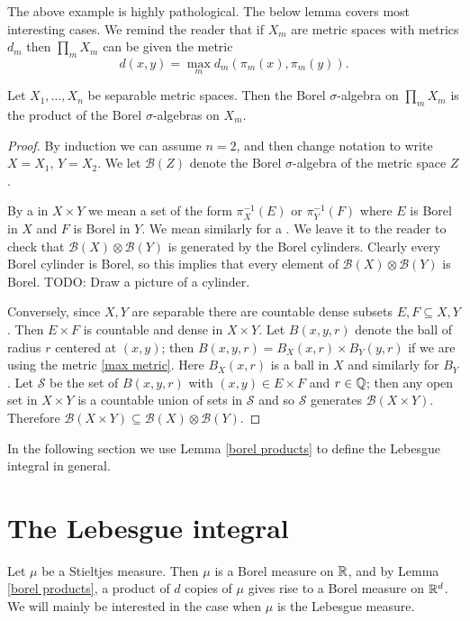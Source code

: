 The above example is highly pathological.
The below lemma covers most interesting cases.
We remind the reader that if $X_m$ are metric spaces with metrics $d_m$ then $\prod_m X_m$ can be given the metric
\begin{equation}
\label{max metric}
d(x, y) = \max_m d_m(\pi_m(x), \pi_m(y)).
\end{equation}

\begin{lemma}
\label{borel products}
Let $X_1, \dots, X_n$ be separable metric spaces.
Then the Borel $\sigma$-algebra on $\prod_m X_m$ is the product of the Borel $\sigma$-algebras on $X_m$.
\end{lemma}
\begin{proof}
By induction we can assume $n = 2$, and then change notation to write $X = X_1$, $Y = X_2$. We let $\mathcal B(Z)$ denote the Borel $\sigma$-algebra of the metric space $Z$.

By a  in $X \times Y$ we mean a set of the form $\pi_X^{-1}(E)$ or $\pi_Y^{-1}(F)$ where $E$ is Borel in $X$ and $F$ is Borel in $Y$.
We mean similarly for a .
We leave it to the reader to check that $\mathcal B(X) \otimes \mathcal B(Y)$ is generated by the Borel cylinders.
Clearly every Borel cylinder is Borel, so this implies that every element of $\mathcal B(X) \otimes \mathcal B(Y)$ is Borel.
TODO: Draw a picture of a cylinder.

Conversely, since $X, Y$ are separable there are countable dense subsets $E, F \subseteq X, Y$.
Then $E \times F$ is countable and dense in $X \times Y$.
Let $B(x, y, r)$ denote the ball of radius $r$ centered at $(x, y)$; then $B(x, y, r) = B_X(x, r) \times B_Y(y, r)$ if we are using the metric \ref{max metric}. Here $B_X(x, r)$ is a ball in $X$ and similarly for $B_Y$.
Let $\mathcal S$ be the set of $B(x, y, r)$ with $(x, y) \in E \times F$ and $r \in \mathbb{Q}$; then any open set in $X \times Y$ is a countable union of sets in $\mathcal S$ and so $\mathcal S$ generates $\mathcal B(X \times Y)$.
Therefore $\mathcal B(X \times Y) \subseteq \mathcal B(X) \otimes \mathcal B(Y)$.
\end{proof}

In the following section we use Lemma \ref{borel products} to define the Lebesgue integral in general.

\section{The Lebesgue integral}
Let $\mu$ be a Stieltjes measure.
Then $\mu$ is a Borel measure on $\mathbb{R}$, and by Lemma \ref{borel products}, a product of $d$ copies of $\mu$ gives rise to a Borel measure on $\mathbb{R}^d$.
We will mainly be interested in the case when $\mu$ is the Lebesgue measure.


